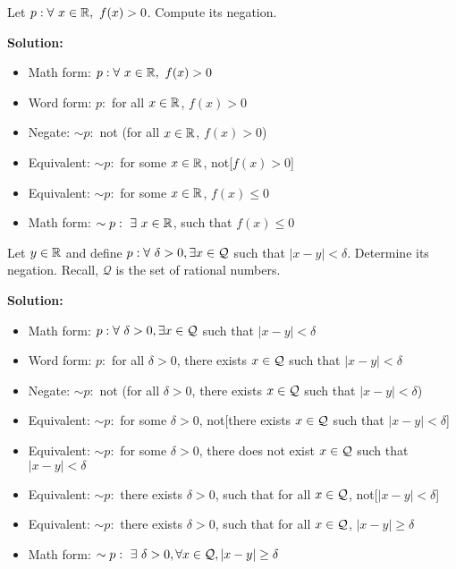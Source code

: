 \begin{example}
Let $p: \forall~x \in \mathbb R,~ f(x) >0$. Compute its negation.
\end{example}

\vspace*{.2cm}

\textbf{Solution:}
\begin{itemize}
    \item Math form: $p: \forall~x \in \mathbb R,~ f(x) >0$
    \item Word form: $p:$ for all $x\in \mathbb R$, $f(x) >0$
    \item Negate: $\sim p:$ not (for all $x\in \mathbb R$, $f(x) >0$)
    \item Equivalent: $\sim p:$ for some $x\in \mathbb R$, not[$f(x) >0$]
     \item Equivalent: $\sim p:$ for some $x\in \mathbb R$, $f(x) \le 0$
      \item Math form: $\sim p:~ \exists~x\in \mathbb R$, such that $f(x) \le 0$
\end{itemize}
\Qed
\vspace*{.2cm}


\vspace*{.2cm}

\begin{example}
Let $y\in \mathbb R$ and define $p: \forall~\delta>0, \exists x \in {\cal Q}$ such that $|x-y| < \delta$. Determine its negation. Recall, $\mathcal{Q}$ is the set of rational numbers.
\end{example}

\vspace*{.2cm}

\textbf{Solution:}
\begin{itemize}
    \item Math form: $p: \forall~\delta>0, \exists x \in {\cal Q}$ such that $|x-y| < \delta$
    \item Word form: $p:$ for all $\delta >0$, there exists $x \in {\cal Q}$ such that $|x-y| < \delta$
    \item Negate: $\sim p:$ not (for all $\delta >0$, there exists $x \in {\cal Q}$ such that $|x-y| < \delta$)
    \item Equivalent: $\sim p:$ for some $\delta >0$, not[there exists $x \in {\cal Q}$ such that $|x-y| < \delta$]
    \item Equivalent:  $\sim p:$ for some $\delta >0$, there does not exist $x \in {\cal Q}$ such that $|x-y| < \delta$
        \item Equivalent:  $\sim p:$ there exists $\delta >0$, such that for all $x \in {\cal Q}$, not[$|x-y| < \delta$]
        \item Equivalent:  $\sim p:$ there exists $\delta >0$, such that for all $x \in {\cal Q}$, $|x-y| \ge \delta$
      \item Math form: $\sim p:~ \exists ~\delta>0, \forall  x \in {\cal Q}, |x-y| \ge  \delta$ 
\end{itemize}
\Qed
\vspace*{.2cm}

